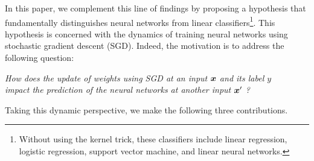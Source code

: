 

In this paper, we complement this line of findings by proposing a hypothesis that fundamentally distinguishes neural networks from linear classifiers\footnote{Without using the kernel trick, these classifiers include linear regression, logistic regression, support vector machine, and linear neural networks.}. This hypothesis is concerned with the dynamics of training neural networks using stochastic gradient descent (SGD). Indeed, the motivation is to address the following question:
\begin{center}
{\centering \it How does the update of weights using SGD at an input $\bm{x}$ and its label $y$ \\impact the prediction of the neural networks at another input $\bm{x}'$ ?} 
\end{center}
Taking this dynamic perspective, we make the following three contributions.

